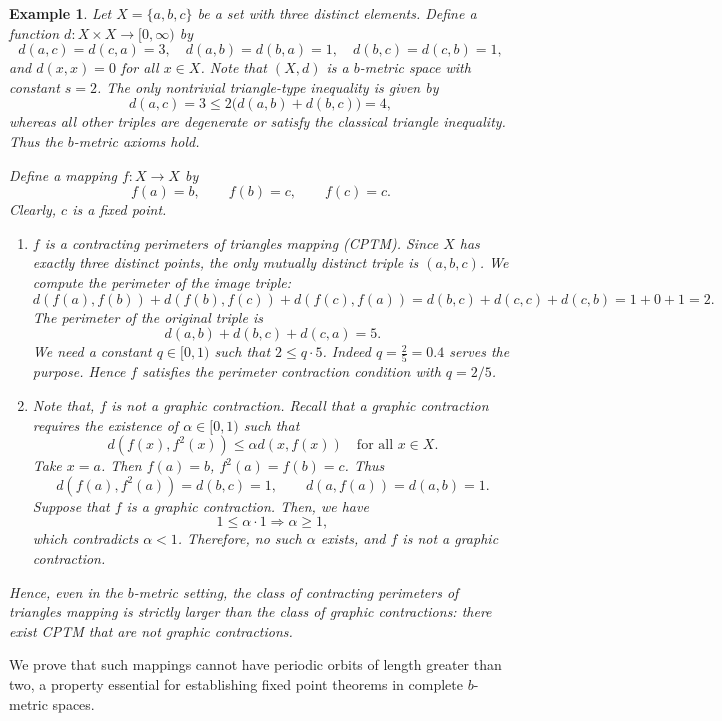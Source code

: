 \documentclass[a4paper,12pt,oneside]{article}
\newtheorem{example}[theorem]{Example}
\numberwithin{equation}{section}
\begin{document}
\begin{example}
\label{ex:not_graphic}
Let $X = \{a,b,c\}$ be a set with three distinct elements. Define a function $d:X\times X\to [0,\infty)$ by
\[
d(a,c) = d(c,a) = 3,\quad d(a,b) = d(b,a) = 1,\quad d(b,c) = d(c,b) = 1,
\]
and $d(x,x)=0$ for all $x\in X$. Note that $(X,d)$ is a $b$-metric space with constant $s = 2$. The only nontrivial triangle-type inequality is given by
\[
d(a,c) = 3\leq 2\big(d(a,b) + d(b,c)\big) = 4,
\]
whereas all other triples are degenerate or satisfy the classical triangle inequality. Thus the $b$-metric axioms hold.

Define a mapping $f:X\to X$ by
\[
f(a) = b,\qquad f(b) = c,\qquad f(c) = c.
\]
Clearly, $c$ is a fixed point.
\begin{enumerate}
\item $f$ is a contracting perimeters of triangles mapping (CPTM). Since $X$ has exactly three distinct points, the only mutually distinct triple is $(a,b,c)$. We compute the perimeter of the image triple:
\[
d(f(a),f(b)) + d(f(b),f(c)) + d(f(c),f(a)) = d(b,c) + d(c,c) + d(c,b) = 1 + 0 + 1 = 2.
\]
The perimeter of the original triple is
\[
d(a,b) + d(b,c) + d(c,a) = 5.
\]
We need a constant $q\in [0,1)$ such that $2\leq q\cdot 5$. Indeed $q = \frac{2}{5} = 0.4$ serves the purpose. Hence $f$ satisfies the perimeter contraction condition with $q = 2/5$.

\item Note that, $f$ is not a graphic contraction. Recall that a graphic contraction requires the existence of $\alpha \in [0,1)$ such that
\[
d(f(x),f^{2}(x))\leq \alpha d(x,f(x))\quad \text{for all } x\in X.
\]
Take $x = a$. Then $f(a) = b$, $f^{2}(a) = f(b) = c$. Thus
\[
d(f(a),f^{2}(a)) = d(b,c) = 1,\qquad d(a,f(a)) = d(a,b) = 1.
\]
Suppose that $f$ is a graphic contraction. Then, we have
\[
1\leq \alpha \cdot 1 \Longrightarrow \alpha \geq 1,
\]
which contradicts $\alpha < 1$. Therefore, no such $\alpha$ exists, and $f$ is not a graphic contraction.
\end{enumerate}
Hence, even in the $b$-metric setting, the class of contracting perimeters of triangles mapping is strictly larger than the class of graphic contractions: there exist CPTM that are not graphic contractions.
\end{example}

We prove that such mappings cannot have periodic orbits of length greater than two, a property essential for establishing fixed point theorems in complete $b$-metric spaces.
\end{document}
